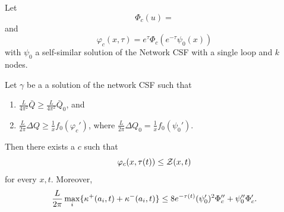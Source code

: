 \documentclass[12pt]{amsart}
\begin{document}
\begin{theorem}
\label{thm:comparison_function}
Let
\[
\Phi_c(u) = 
\]
and
\[
\varphi_c(x, \tau) = e^{\tau} \Phi_c(e^{-\tau} \psi_0(x))
\]
with $\psi_0$ a self-similar solution of the Network CSF with a single loop and $k$ nodes.

Let $\gamma$ be a a solution of the network CSF such that
\begin{enumerate}
\item $\frac{L}{4\pi^2} \bar{Q} \geq \frac{L}{4\pi^2} \bar{Q}_0$, and
\item $\frac{L}{2\pi} \Delta Q \geq \tfrac{1}{x} f_0(\varphi_c')$, where $\frac{L}{2\pi} \Delta Q_0 = \tfrac{1}{x} f_0(\psi_0')$.
\end{enumerate}
Then there exists a $c$ such that
\[
\varphi_c(x, \tau(t)) \leq \operatorname{\mathcal{Z}}(x, t)
\]
for every $x, t$. Moreover,
\[
\frac{L}{2\pi} \max_i \{\operatorname{\kappa}^+(a_i, t) + \operatorname{\kappa}^-(a_i, t)\} \leq 8 e^{-\tau(t)} (\psi_0')^2 \Phi_c'' + \psi_0'' \Phi_c'.
\]
\end{theorem}
\end{document}
